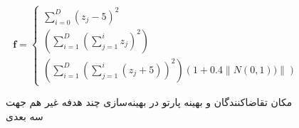 \begin{equation}
	\boldsymbol{f} = 
	\begin{cases}
		\sum_{i=0}^{D}(z_j-5)^2 \\
		\left(\sum_{i=1}^{D}\left(\sum_{j=1}^{i}z_j\right)^2\right) \\
		\left(\sum_{i=1}^{D}\left(\sum_{j=1}^{i}(z_j+5)\right)^2\right)(1+0.4\left\|N(0, 1))\right\|) 
	\end{cases}
\end{equation}


\begin{figure}[H]
	\centering
	\hfill
	\caption{مکان تقاضا‌کنندگان و بهینه پارتو در بهینه‌سازی چند هدفه غیر هم جهت سه بعدی}
\end{figure}

